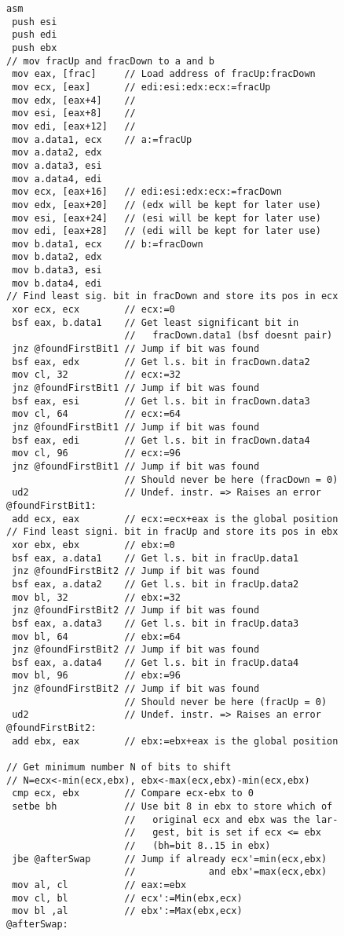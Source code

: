 \begin{multicols}{2}
{\begin{verbatim}
asm
 push esi            
 push edi
 push ebx
// mov fracUp and fracDown to a and b
 mov eax, [frac]     // Load address of fracUp:fracDown
 mov ecx, [eax]      // edi:esi:edx:ecx:=fracUp
 mov edx, [eax+4]    //
 mov esi, [eax+8]    //
 mov edi, [eax+12]   // 
 mov a.data1, ecx    // a:=fracUp
 mov a.data2, edx
 mov a.data3, esi
 mov a.data4, edi
 mov ecx, [eax+16]   // edi:esi:edx:ecx:=fracDown
 mov edx, [eax+20]   // (edx will be kept for later use)
 mov esi, [eax+24]   // (esi will be kept for later use)
 mov edi, [eax+28]   // (edi will be kept for later use)
 mov b.data1, ecx    // b:=fracDown
 mov b.data2, edx
 mov b.data3, esi
 mov b.data4, edi
// Find least sig. bit in fracDown and store its pos in ecx
 xor ecx, ecx        // ecx:=0
 bsf eax, b.data1    // Get least significant bit in
                     //   fracDown.data1 (bsf doesnt pair)
 jnz @foundFirstBit1 // Jump if bit was found
 bsf eax, edx        // Get l.s. bit in fracDown.data2
 mov cl, 32          // ecx:=32
 jnz @foundFirstBit1 // Jump if bit was found
 bsf eax, esi        // Get l.s. bit in fracDown.data3
 mov cl, 64          // ecx:=64
 jnz @foundFirstBit1 // Jump if bit was found
 bsf eax, edi        // Get l.s. bit in fracDown.data4
 mov cl, 96          // ecx:=96
 jnz @foundFirstBit1 // Jump if bit was found
                     // Should never be here (fracDown = 0)
 ud2                 // Undef. instr. => Raises an error
@foundFirstBit1:
 add ecx, eax        // ecx:=ecx+eax is the global position 
// Find least signi. bit in fracUp and store its pos in ebx
 xor ebx, ebx        // ebx:=0
 bsf eax, a.data1    // Get l.s. bit in fracUp.data1
 jnz @foundFirstBit2 // Jump if bit was found
 bsf eax, a.data2    // Get l.s. bit in fracUp.data2
 mov bl, 32          // ebx:=32
 jnz @foundFirstBit2 // Jump if bit was found
 bsf eax, a.data3    // Get l.s. bit in fracUp.data3
 mov bl, 64          // ebx:=64
 jnz @foundFirstBit2 // Jump if bit was found
 bsf eax, a.data4    // Get l.s. bit in fracUp.data4
 mov bl, 96          // ebx:=96
 jnz @foundFirstBit2 // Jump if bit was found
                     // Should never be here (fracUp = 0)
 ud2                 // Undef. instr. => Raises an error
@foundFirstBit2:
 add ebx, eax        // ebx:=ebx+eax is the global position

// Get minimum number N of bits to shift
// N=ecx<-min(ecx,ebx), ebx<-max(ecx,ebx)-min(ecx,ebx)
 cmp ecx, ebx        // Compare ecx-ebx to 0
 setbe bh            // Use bit 8 in ebx to store which of
                     //   original ecx and ebx was the lar-
                     //   gest, bit is set if ecx <= ebx
                     //   (bh=bit 8..15 in ebx)
 jbe @afterSwap      // Jump if already ecx'=min(ecx,ebx)
                     //             and ebx'=max(ecx,ebx)
 mov al, cl          // eax:=ebx
 mov cl, bl          // ecx':=Min(ebx,ecx)
 mov bl ,al          // ebx':=Max(ebx,ecx)
@afterSwap:


\end{verbatim}}
\end{multicols}
